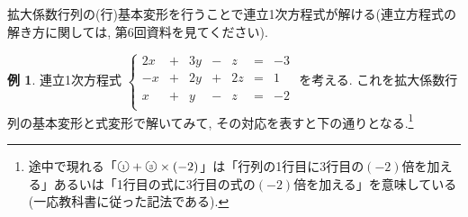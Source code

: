 \documentclass[dvipdfmx,a4paper,11pt]{article}
\newcommand{\maru}[1]{\raise0.2ex\hbox{\textcircled{\tiny{#1}}}}
\theoremstyle{definition}
\newtheorem{exa}[thm]{例}
\begin{document}
拡大係数行列の(行)基本変形を行うことで連立1次方程式が解ける(連立方程式の解き方に関しては, 第6回資料を見てください).

\begin{exa}
 連立1次方程式
 $
 \left\{ 
\begin{matrix}
2x&+&3y& -&z &= &-3 \\
-x&+&2y& +&2z &= &1 \\
x&+&y& -&z &= &-2 \\
\end{matrix}
\right.
 $
 を考える. 
 これを拡大係数行列の基本変形と式変形で解いてみて, その対応を表すと下の通りとなる.\footnote{途中で現れる「$\maru{1}+\maru{3}\times(-2)$」は「行列の1行目に3行目の$(-2)$倍を加える」あるいは「1行目の式に3行目の式の$(-2)$倍を加える」を意味している(一応教科書に従った記法である).}

 

\end{exa}
\end{document}

